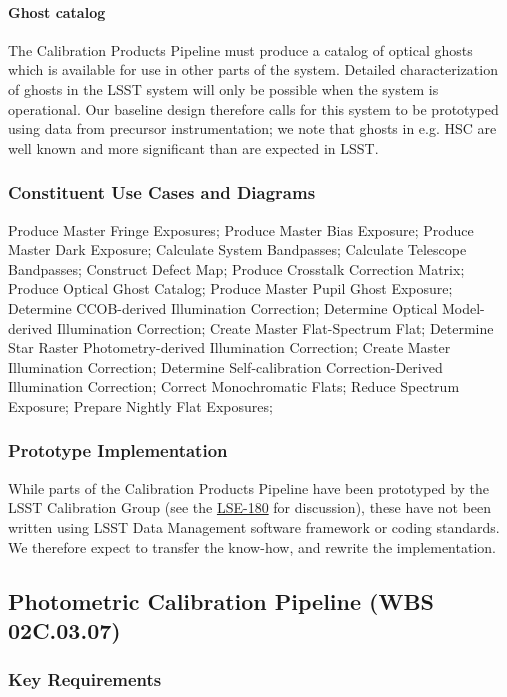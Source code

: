 \documentclass[12pt]{article}
\newcommand{\ds}[2]{{\color{blue} \href{https://docushare.lsstcorp.org/docushare/dsweb/Get/#1}{#2}}\xspace}
\newcommand{\NewPCP}{\ds{LSE-180}{LSE-180}}
\newcommand{\wbsPhotoCal}{WBS 02C.03.07}
\begin{document}
\paragraph{Ghost catalog}

The Calibration Products Pipeline must produce a catalog of optical ghosts which is available for use in other parts of the system. Detailed characterization of ghosts in the LSST system will only be possible when the system is operational. Our baseline design therefore calls for this system to be prototyped using data from precursor instrumentation; we note that ghosts in e.g. HSC are well known and more significant than are expected in LSST.

\subsubsection{Constituent Use Cases and Diagrams}

Produce Master Fringe Exposures; Produce Master Bias Exposure; Produce Master Dark Exposure; Calculate System Bandpasses; Calculate Telescope Bandpasses; Construct Defect Map; Produce Crosstalk Correction Matrix; Produce Optical Ghost Catalog; Produce Master Pupil Ghost Exposure; Determine CCOB-derived Illumination Correction; Determine Optical Model-derived Illumination Correction; Create Master Flat-Spectrum Flat; Determine Star Raster Photometry-derived Illumination Correction; Create Master Illumination Correction; Determine Self-calibration Correction-Derived Illumination Correction; Correct Monochromatic Flats; Reduce Spectrum Exposure; Prepare Nightly Flat Exposures;

\subsubsection{Prototype Implementation}

While parts of the Calibration Products Pipeline have been prototyped by the LSST Calibration Group (see the \NewPCP for discussion), these have not been written using LSST Data Management software framework or coding standards. We therefore expect to transfer the know-how, and rewrite the implementation.

\clearpage

\subsection{Photometric Calibration Pipeline (\wbsPhotoCal)}

\subsubsection{Key Requirements}
\end{document}
